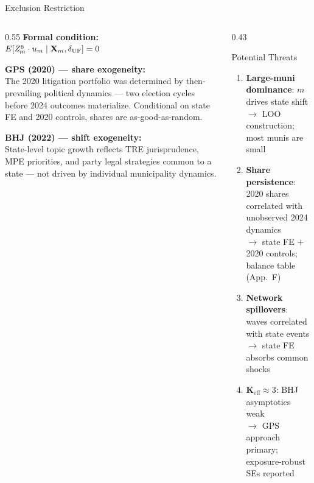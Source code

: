 \documentclass[aspectratio=169,10pt]{beamer}
\newcommand{\bZ}{\mathit{Z}_{m}^{\textsc{b}}}
\begin{document}
\begin{frame}{Exclusion Restriction}
\begin{columns}[T]
\begin{column}{0.55\textwidth}
\textbf{Formal condition:}\\
$E[\bZ \cdot u_m \mid \mathbf{X}_m, \delta_{\text{UF}}] = 0$
\medskip

\textbf{GPS (2020) --- share exogeneity:}\\
The 2020 litigation portfolio was determined by then-prevailing political dynamics --- two election cycles before 2024 outcomes materialize. Conditional on state FE and 2020 controls, shares are as-good-as-random.

\medskip
\textbf{BHJ (2022) --- shift exogeneity:}\\
State-level topic growth reflects TRE jurisprudence, MPE priorities, and party legal strategies common to a state --- not driven by individual municipality dynamics.
\end{column}
\begin{column}{0.43\textwidth}
\begin{alertblock}{Potential Threats}
  \footnotesize
  \begin{enumerate}\itemsep3pt
    \item \textbf{Large-muni dominance}: $m$ drives state shift\\
    $\to$ LOO construction; most munis are small
    \item \textbf{Share persistence}: 2020 shares correlated with unobserved 2024 dynamics\\
    $\to$ state FE $+$ 2020 controls; balance table (App.~F)
    \item \textbf{Network spillovers}: waves correlated with state events\\
    $\to$ state FE absorbs common shocks
    \item \textbf{K$_{\text{eff}}\approx3$}: BHJ asymptotics weak\\
    $\to$ GPS approach primary; exposure-robust SEs reported
  \end{enumerate}
\end{alertblock}
\end{column}
\end{columns}
\end{frame}
\end{document}

